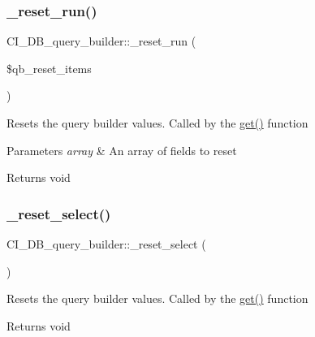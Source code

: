 \subsubsection{\texorpdfstring{\+\_\+reset\+\_\+run()}{\_reset\_run()}}
{\footnotesize\ttfamily C\+I\+\_\+\+D\+B\+\_\+query\+\_\+builder\+::\+\_\+reset\+\_\+run (\begin{DoxyParamCaption}\item[{}]{\$qb\+\_\+reset\+\_\+items }\end{DoxyParamCaption})\hspace{0.3cm}{\ttfamily [protected]}}

Resets the query builder values. Called by the \mbox{\hyperlink{class_c_i___d_b__query__builder_a2e2e9087b1d03de3f39b4167f85e7721}{get()}} function


\begin{DoxyParams}{Parameters}
{\em array} & An array of fields to reset \\
\hline
\end{DoxyParams}
\begin{DoxyReturn}{Returns}
void 
\end{DoxyReturn}
\mbox{\label{class_c_i___d_b__query__builder_af2eefd36a0aa741e8ff0b0ce150a1652}} 
\subsubsection{\texorpdfstring{\+\_\+reset\+\_\+select()}{\_reset\_select()}}
{\footnotesize\ttfamily C\+I\+\_\+\+D\+B\+\_\+query\+\_\+builder\+::\+\_\+reset\+\_\+select (\begin{DoxyParamCaption}{ }\end{DoxyParamCaption})\hspace{0.3cm}{\ttfamily [protected]}}

Resets the query builder values. Called by the \mbox{\hyperlink{class_c_i___d_b__query__builder_a2e2e9087b1d03de3f39b4167f85e7721}{get()}} function

\begin{DoxyReturn}{Returns}
void 
\end{DoxyReturn}
\mbox{\label{class_c_i___d_b__query__builder_ae603144f9a3c6733964bb48bff3d7619}} 
